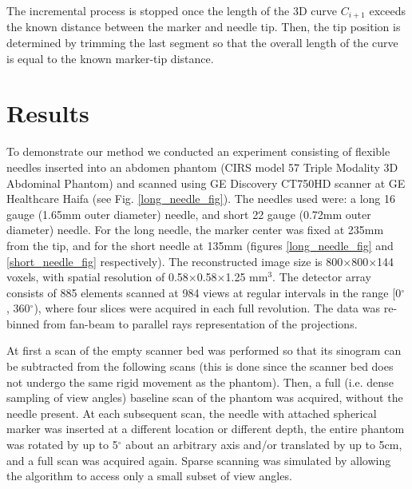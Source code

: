 The incremental process is stopped once the length of the 3D curve $C_{i+1}$ exceeds the known distance between the marker and needle tip. Then, the tip position is determined by trimming the last segment so that the overall length of the curve is equal to the known marker-tip distance.

\section{Results}

To demonstrate our method we conducted an experiment consisting of flexible needles inserted into an abdomen phantom (CIRS model 57 Triple Modality 3D Abdominal Phantom) and scanned using GE Discovery CT750HD scanner at GE Healthcare Haifa (see Fig. \ref{long_needle_fig}). The needles used were: a long 16 gauge (1.65mm outer diameter) needle, and short 22 gauge (0.72mm outer diameter) needle. For the long needle, the marker center was fixed at 235mm from the tip, and for the short needle at 135mm (figures \ref{long_needle_fig} and \ref{short_needle_fig} respectively).
The reconstructed image size is 800$\times$800$\times$144 voxels, with spatial resolution of 0.58$\times$0.58$\times$1.25 mm$^3$. The detector array consists of 885 elements scanned at 984 views at regular intervals in the range [0$^{\circ}$ , 360$^{\circ}$), where four slices were acquired in each full revolution. The data was re-binned from fan-beam to parallel rays representation of the projections.

At first a scan of the empty scanner bed was performed so that its sinogram can be subtracted from the following scans (this is done since the scanner bed does not undergo the same rigid movement as the phantom). Then, a full (i.e. dense sampling of view angles) baseline scan of the phantom was acquired, without the needle present. At each subsequent scan, the needle with attached spherical marker was inserted at a different location or different depth, the entire phantom was rotated by up to 5$^\circ$ about an arbitrary axis and/or translated by up to 5cm, and a full scan was acquired again. Sparse scanning was simulated by allowing the algorithm to access only a small subset of view angles.



